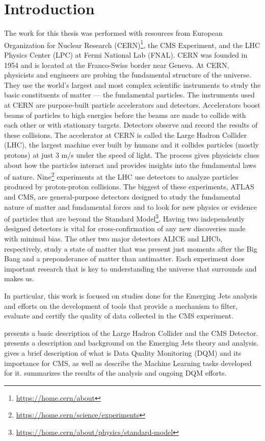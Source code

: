 \chapter{Introduction}

The work for this thesis was performed with resources from European Organization for Nuclear Research (CERN)\footnote{\url{https://home.cern/about}}, the CMS Experiment\cite{CMS_detector}, and the LHC Physics Center (LPC) at Fermi National Lab (FNAL).
CERN was founded in 1954 and is located at the Franco-Swiss border near Geneva. At CERN, physicists and engineers are probing the fundamental structure of the universe. They use the world's largest and most complex scientific instruments to study the basic constituents of matter --- the fundamental particles.
The instruments used at CERN are purpose-built particle accelerators and detectors. Accelerators boost beams of particles to high energies before the beams are made to collide with each other or with stationary targets. Detectors observe and record the results of these collisions. The accelerator at CERN is called the Large Hadron Collider (LHC), the largest machine ever built by humans and it collides particles (mostly protons) at just
3 m/s under the speed of light.
The process gives physicists clues about how the particles interact and provides insights into the fundamental laws of nature. Nine\footnote{\url{https://home.cern/science/experiments}} experiments at the LHC use detectors to analyze particles produced by proton-proton collisions.
The biggest of these experiments, ATLAS and CMS, are general-purpose detectors designed to study the
fundamental nature of matter and fundamental forces and to look for new physics or evidence of particles that are beyond the Standard Model\footnote{\url{https://home.cern/about/physics/standard-model}}. Having two independently designed detectors is vital for cross-confirmation of any new discoveries made with minimal bias. The other two major detectors ALICE and LHCb, respectively, study a state of matter that was present just moments after the Big Bang and a preponderance of matter than antimatter.  Each experiment does important research that is key to understanding the universe that surrounds and makes us.

In particular, this work is focused on studies done for the Emerging Jets analysis and efforts on the development of tools that provide a mechanism to filter, evaluate and certify the quality of data collected in the CMS experiment.


 presents a basic description of the Large Hadron Collider and the CMS Detector.
 presents a description and background on the Emerging Jets theory and analysis.
 gives a brief description of what is Data Quality Monitoring (DQM) and its importance for CMS, as well as describe the Machine Learning tasks developed for it.
 summarizes the results of the analysis and ongoing DQM efforts.
